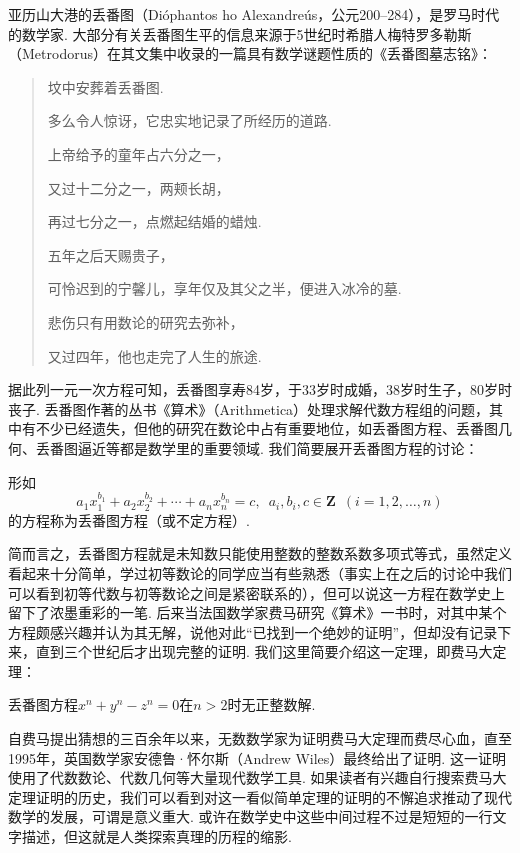 亚历山大港的丢番图（Dióphantos ho Alexandreús，公元200--284），是罗马时代的数学家. 大部分有关丢番图生平的信息来源于5世纪时希腊人梅特罗多勒斯（Metrodorus）在其文集中收录的一篇具有数学谜题性质的《丢番图墓志铭》：
\begin{quote}
    \kaishu
    坟中安葬着丢番图.

    多么令人惊讶，它忠实地记录了所经历的道路.

    上帝给予的童年占六分之一，

    又过十二分之一，两颊长胡，

    再过七分之一，点燃起结婚的蜡烛.

    五年之后天赐贵子，

    可怜迟到的宁馨儿，享年仅及其父之半，便进入冰冷的墓.

    悲伤只有用数论的研究去弥补，

    又过四年，他也走完了人生的旅途.
\end{quote}
据此列一元一次方程可知，丢番图享寿84岁，于33岁时成婚，38岁时生子，80岁时丧子. 丢番图作著的丛书《算术》（Arithmetica）处理求解代数方程组的问题，其中有不少已经遗失，但他的研究在数论中占有重要地位，如丢番图方程、丢番图几何、丢番图逼近等都是数学里的重要领域. 我们简要展开丢番图方程的讨论：
\begin{definition}{}{}
    形如
    \[a_1x_1^{b_1}+a_2x_2^{b_2}+\cdots+a_nx_n^{b_n}=c,\enspace a_i,b_i,c\in\mathbf{Z}\enspace(i=1,2,\ldots,n)\]
    的方程称为丢番图方程（或不定方程）.
\end{definition}

简而言之，丢番图方程就是未知数只能使用整数的整数系数多项式等式，虽然定义看起来十分简单，学过初等数论的同学应当有些熟悉（事实上在之后的讨论中我们可以看到初等代数与初等数论之间是紧密联系的），但可以说这一方程在数学史上留下了浓墨重彩的一笔. 后来当法国数学家费马研究《算术》一书时，对其中某个方程颇感兴趣并认为其无解，说他对此``已找到一个绝妙的证明''，但却没有记录下来，直到三个世纪后才出现完整的证明. 我们这里简要介绍这一定理，即费马大定理：
\begin{theorem}{}{}
    丢番图方程$x^n+y^n-z^n=0$在$n>2$时无正整数解.
\end{theorem}

自费马提出猜想的三百余年以来，无数数学家为证明费马大定理而费尽心血，直至1995年，英国数学家安德鲁·怀尔斯（Andrew Wiles）最终给出了证明. 这一证明使用了代数数论、代数几何等大量现代数学工具. 如果读者有兴趣自行搜索费马大定理证明的历史，我们可以看到对这一看似简单定理的证明的不懈追求推动了现代数学的发展，可谓是意义重大. 或许在数学史中这些中间过程不过是短短的一行文字描述，但这就是人类探索真理的历程的缩影.

